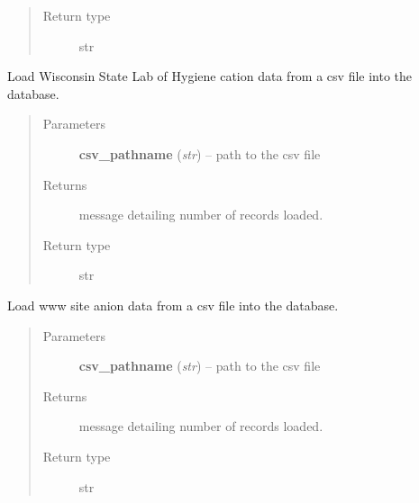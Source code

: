 \documentclass[letterpaper,10pt,english]{sphinxmanual}
\begin{document}
\begin{fulllineitems}
\begin{fulllineitems}
\begin{quote}
\begin{description}
\item[{Return type}] \leavevmode
str

\end{description}\end{quote}

\end{fulllineitems}


\begin{fulllineitems}
\label{modules:webb_utils.upload_data.UploadData.load_wslh_cation_data}
Load Wisconsin State Lab of Hygiene cation data from a csv file into the database.
\begin{quote}\begin{description}
\item[{Parameters}] \leavevmode
\textbf{csv\_pathname} (\emph{str}) -- path to the csv file

\item[{Returns}] \leavevmode
message detailing number of records loaded.

\item[{Return type}] \leavevmode
str

\end{description}\end{quote}

\end{fulllineitems}


\begin{fulllineitems}
\label{modules:webb_utils.upload_data.UploadData.load_www_sites_data}
Load www site anion data from a csv file into the database.
\begin{quote}\begin{description}
\item[{Parameters}] \leavevmode
\textbf{csv\_pathname} (\emph{str}) -- path to the csv file

\item[{Returns}] \leavevmode
message detailing number of records loaded.

\item[{Return type}] \leavevmode
str

\end{description}\end{quote}

\end{fulllineitems}


\end{fulllineitems}
\end{document}
